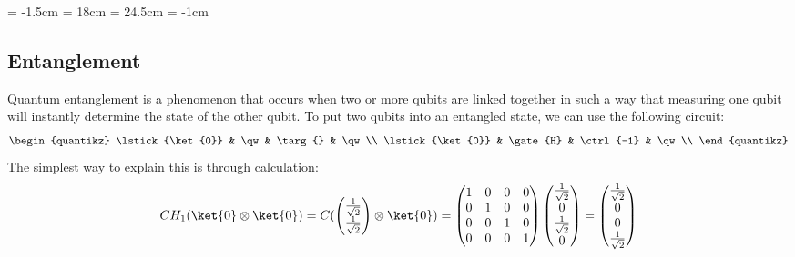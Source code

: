 \documentclass[a4paper, 11pt]{article}
\begin{document}
    \topmargin = -1.5cm
    \textwidth = 18cm
    \textheight = 24.5cm
    \oddsidemargin = -1cm

    \subsection{Entanglement} %
    Quantum entanglement is a phenomenon that occurs when two or more qubits are linked together in such a way that measuring one qubit will instantly determine the state of the other qubit.
    To put two qubits into an entangled state, we can use the following circuit:
    \[
        \begin{quantikz}
            \lstick{\ket{0}} & \qw & \targ{} & \qw\\
            \lstick{\ket{0}} & \gate{H} & \ctrl{-1} & \qw\\
        \end{quantikz}
    \]
    The simplest way to explain this is through calculation:
    \[
        C H_{1} (\ket{0} \otimes \ket{0}) =
        C (
        \begin{pmatrix}
            \frac{1}{\sqrt{2}} \\
            \frac{1}{\sqrt{2}} \\
        \end{pmatrix}
        \otimes
        \ket{0}
        ) = 
        \begin{pmatrix}
            1 & 0 & 0 & 0 \\
            0 & 1 & 0 & 0 \\
            0 & 0 & 1 & 0 \\
            0 & 0 & 0 & 1 \\
        \end{pmatrix}
        \begin{pmatrix}
            \frac{1}{\sqrt{2}} \\
            0 \\
            \frac{1}{\sqrt{2}} \\
            0 \\
        \end{pmatrix} =
        \begin{pmatrix}
            \frac{1}{\sqrt{2}} \\
            0 \\
            0 \\
            \frac{1}{\sqrt{2}} \\
        \end{pmatrix}
    \]
\end{document}
